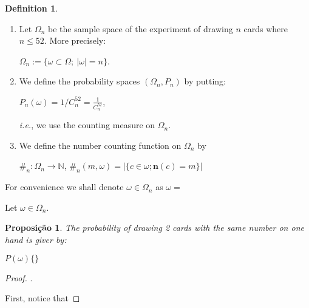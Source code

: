 \documentclass[]{article}
\newtheorem{proposition}{Proposição}[section]
\theoremstyle{definition}
\newtheorem{definition}{Definition}[section]
\theoremstyle{definition}
\newcommand{\raw}{\rightarrow}
\newcommand{\ie}{\textit{i.e.}}
\newcommand{\bb}{\mathbb}
\begin{document}
	
	\begin{definition}
		
		\begin{enumerate}
			\item 	Let $\Omega_n$ be the sample space of the experiment of drawing $n$ cards where $n \leq 52$. More precisely:
			
			\begin{center}
				$\Omega_n := \{ \omega \subset \Omega; \ |\omega| = n \} $.
			\end{center}
			
			\item We define the probability spaces $(\Omega_n, P_n)$ by putting:
			
			\begin{center}
				$P_n(\omega ) = 1/C_{n}^{52} = \frac{1}{C_{n}^{52}}$, 
			\end{center}
			
			\ie, we use the counting measure on $\Omega_n$.
			
			\item We define the number counting function on $\Omega_n$ by
			
			\begin{center}
				$ \#_n: \Omega_n \raw \bb{N}$, $\#_n(m, \omega) = |\{ c \in \omega; \textbf{n}(c) = m \}|$
			\end{center}
			
		\end{enumerate}
		
		
	\end{definition}
	
	For convenience we shall denote $\omega \in \Omega_n$ as $\omega = $
	
	
	Let $\omega \in \Omega_n$. 
	
	\begin{proposition}
		The probability of drawing 2 cards with the same number on one hand is giver by:
		
		\begin{center}
			$P(\omega) \{\} $
		\end{center}
		
	\end{proposition}
	
	\begin{proof}
		
		.
		
		First, notice that 
	\end{proof}
	
\end{document}
